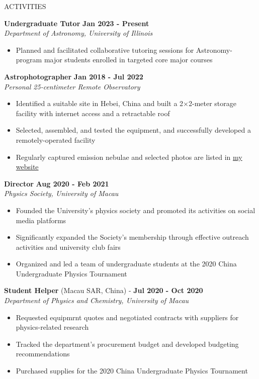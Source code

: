 \documentclass[11pt]{article}
\begin{document}
\begin{section}{ACTIVITIES}

\textbf{Undergraduate Tutor} \hfill \textbf{Jan 2023 - Present} \\
\textit{Department of Astronomy, University of Illinois} 
\begin{itemize}[leftmargin=1.5em]
    \item Planned and facilitated collaborative tutoring sessions for Astronomy-program major students enrolled in targeted core major courses 
\end{itemize}

\textbf{Astrophotographer} \hfill \textbf{Jan 2018 - Jul 2022}  \\
\textit{Personal 25-centimeter Remote Observatory} 
\begin{itemize}[leftmargin=1.5em]
    \item Identified a suitable site in Hebei, China and built a 2$\times$2-meter storage facility with internet access and a retractable roof
    \item Selected, assembled, and tested the equipment, and successfully developed a remotely-operated facility
    \item Regularly captured emission nebulae and selected photos are listed in \href{https://cheysen.fit/astrophotography/}{my website}
\end{itemize}

\textbf{Director} \hfill \textbf{Aug 2020 - Feb 2021} \\
\textit{Physics Society, University of Macau}
\begin{itemize}[leftmargin=1.5em]
    \item Founded the University's physics society and promoted its activities on social media platforms
    \item Significantly expanded the Society's membership through effective outreach activities and university club fairs
    \item Organized and led a team of undergraduate students at the 2020 China Undergraduate Physics Tournament
\end{itemize}


\textbf{Student Helper} (Macau SAR, China) - \hfill \textbf{Jul 2020 - Oct 2020} \\
\textit{Department of Physics and Chemistry, University of Macau} 
\begin{itemize}[leftmargin=1.5em]
    \item Requested equipmrnt quotes and negotiated contracts with suppliers for physics-related research 
    \item Tracked the department's procurement budget and developed budgeting recommendations
    \item Purchased supplies for the 2020 China Undergraduate Physics Tournament
\end{itemize}

\end{section}
\end{document}
